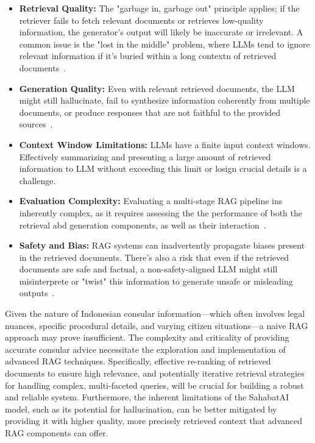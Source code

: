 \documentclass[12pt]{report}
\begin{document}
\begin{itemize}
    \item \textbf{Retrieval Quality:} The "garbage in, garbage out" principle applies; if the retriever fails to fetch relevant documents or retrieves low-quality information, the generator's output will likely be inaccurate or irrelevant. A common issue is the "lost in the middle" problem, where LLMs tend to ignore relevant information if it's buried within a long contextn of retrieved documents~\cite{Zhang2025}.
    \item \textbf{Generation Quality:} Even with relevant retrieved documents, the LLM might still hallucinate, fail to synthesize information coherently from multiple documents, or produce responses that are not faithful to the provided sources~\cite{10.1145/3644815.3644945,zhou2024trustworthinessretrievalaugmentedgenerationsystems}.
    \item \textbf{Context Window Limitations:} LLMs have a finite input context windows. Effectively summarizing and presenting a large amount of retrieved information to LLM without exceeding this limit or losign crucial details is a challenge. 
    \item \textbf{Evaluation Complexity:} Evaluating a multi-stage RAG pipeline ins inherently complex, as it requires assessing the the performance of both the retrieval abd generation components, as well as their interaction~\cite{brehme2025llmstrustedevaluatingrag}.
    \item \textbf{Safety and Bias:} RAG systems can inadvertently propagate biases present in the retrieved documents. There's also a risk that even if the retrieved documents are safe and factual, a non-safety-aligned LLM might still misinterprete or "twist" this information to generate unsafe or misleading outputs~\cite{an2025ragllmssafersafety}.
\end{itemize}

Given the nature of Indonesian consular information—which often involves legal nuances, specific procedural details, and varying citizen situations—a naive RAG approach may prove insufficient. The complexity and criticality of providing accurate consular advice necessitate the exploration and implementation of advanced RAG techniques. Specifically, effective re-ranking of retrieved documents to ensure high relevance, and potentially iterative retrieval strategies for handling complex, multi-faceted queries, will be crucial for building a robust and reliable system.
Furthermore, the inherent limitations of the SahabatAI model, such as its potential for
hallucination, can be better mitigated by providing it with higher quality, more
precisely retrieved context that advanced RAG components can offer.
\end{document}

